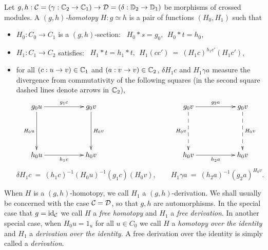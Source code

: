 \bigskip
Let $g,h : \mathcal{C}=(\gamma:\mathbb{C}_2\to\mathbb{C}_1) \to \mathcal{D}=(\delta:\mathbb{D}_2\to\mathbb{D}_1)$ 
be morphisms of crossed modules. 
A \emph{$(g,h)$-homotopy} $H : g \simeq h$ 
is a pair of functions $(H_0,H_1)$ such that 
\begin{itemize} 
\item
$H_0 : C_0 \to C_1$ is a $(g,h)$-section:~ $H_0 * s = g_0,~~ H_0 * t = h_0$, 
\item
$H_1 : C_1 \to C_2$ satisfies:~ 
$H_1*t = h_1*t,~~ H_1(cc') ~=~ (H_1c)^{h_1c'}(H_1c')$, 
\item 
for all $(c : u \to v) \in \mathbb{C}_1$ and $(a : v \to v) \in \mathbb{C}_2$, 
$\delta H_1 c$ and $H_1 \gamma a$ measure the divergence from 
commutativity of the following squares 
(in the second square dashed lines denote arrows in $\mathbb{C}_2$), 
$$
\xymatrix{
g_0u \ar[rr]^{g_1c} \ar[dd]_{H_0u} 
  &&  g_0v \ar[dd]^{H_0v}
      &&  &&  g_0v \ar[rr]^{g_2a} \ar@{-->}[dd]_{H_0v} 
              &&  g_0v \ar@{-->}[dd]^{H_0v} \\
  &&  &&  &&  &&                         \\ 
h_0u \ar[rr]_{h_1c} 
  &&  h_0v 
      &&  &&  h_0v \ar[rr]_{h_2a} 
              &&  h_0v
}$$
\begin{equation}  \label{eq:comm-rules}
\delta H_1 c ~=~ (h_1c)^{-1}(H_0u)^{-1}(g_1c)(H_0v), \qquad 
H_1 \gamma a ~=~ (h_2a)^{-1} (g_2a)^{H_0v}. 
\end{equation}
\end{itemize}

When $H$ is a $(g,h)$-homotopy, we call $H_1$ a $(g,h)$-derivation. 
We shall usually be concerned with the case $\mathcal{C}=\mathcal{D}$, 
so that $g,h$ are automorphisms. 
In the special case that $g=\mathrm{id}_{\mathcal{C}}$ we call $H$ a \emph{free homotopy} 
and $H_1$ a \emph{free derivation}. 
In another special case, when $H_0u = 1_u$ for all $u \in C_0$ 
we call $H$ a \emph{homotopy over the identity} 
and $H_1$ a \emph{derivation over the identity}. 
A free derivation over the identity is simply called a \emph{derivation}. 

